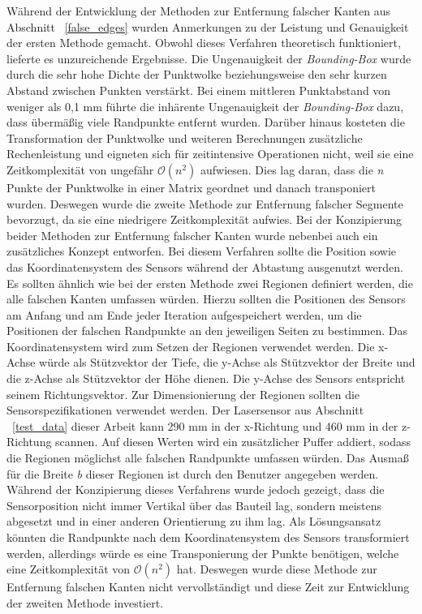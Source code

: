 Während der Entwicklung der Methoden zur Entfernung falscher Kanten aus Abschnitt ~\ref{false_edges} wurden Anmerkungen zu der Leistung und Genauigkeit der ersten Methode gemacht. Obwohl dieses Verfahren theoretisch funktioniert, lieferte es unzureichende Ergebnisse. Die Ungenauigkeit der \textit{Bounding-Box} wurde durch die sehr hohe Dichte der Punktwolke beziehungsweise den sehr kurzen Abstand zwischen Punkten verstärkt. Bei einem mittleren Punktabstand von weniger als 0,1 mm führte die inhärente Ungenauigkeit der \textit{Bounding-Box} dazu, dass übermäßig viele Randpunkte entfernt wurden. Darüber hinaus kosteten die Transformation der Punktwolke und weiteren Berechnungen zusätzliche Rechenleistung und eigneten sich für zeitintensive Operationen nicht, weil sie eine Zeitkomplexität von ungefähr $\mathcal{O}(n^2)$ aufwiesen. Dies lag daran, dass die \textit{n} Punkte der Punktwolke in einer Matrix geordnet und danach transponiert wurden. Deswegen wurde die zweite Methode zur Entfernung falscher Segmente bevorzugt, da sie eine niedrigere Zeitkomplexität aufwies. Bei der Konzipierung beider Methoden zur Entfernung falscher Kanten wurde nebenbei auch ein zusätzliches Konzept entworfen. Bei diesem Verfahren sollte die Position sowie das Koordinatensystem des Sensors während der Abtastung ausgenutzt werden. Es sollten ähnlich wie bei der ersten Methode zwei Regionen definiert werden, die alle falschen Kanten umfassen würden. Hierzu sollten die Positionen des Sensors am Anfang und am Ende jeder Iteration aufgespeichert werden, um die Positionen der falschen Randpunkte an den jeweiligen Seiten zu bestimmen. Das Koordinatensystem wird zum Setzen der Regionen verwendet werden. Die x-Achse würde als Stützvektor der Tiefe, die y-Achse als Stützvektor der Breite und die z-Achse als Stützvektor der Höhe dienen. Die y-Achse des Sensors entspricht seinem Richtungsvektor. Zur Dimensionierung der Regionen sollten die Sensorspezifikationen verwendet werden. Der Lasersensor aus Abschnitt ~\ref{test_data} dieser Arbeit kann 290 mm in der x-Richtung und 460 mm in der z-Richtung scannen. Auf diesen Werten wird ein zusätzlicher Puffer addiert, sodass die Regionen möglichst alle falschen Randpunkte umfassen würden. Das Ausmaß für die Breite \textit{b} dieser Regionen ist durch den Benutzer angegeben werden. Während der Konzipierung dieses Verfahrens wurde jedoch gezeigt, dass die Sensorposition nicht immer Vertikal über das Bauteil lag, sondern meistens abgesetzt und in einer anderen Orientierung zu ihm lag. Als Lösungsansatz könnten die Randpunkte nach dem Koordinatensystem des Sensors transformiert werden, allerdings würde es eine Transponierung der Punkte benötigen, welche eine Zeitkomplexität von $\mathcal{O}(n^2)$ hat. Deswegen wurde diese Methode zur Entfernung falschen Kanten nicht vervollständigt und diese Zeit zur Entwicklung der zweiten Methode investiert. 

